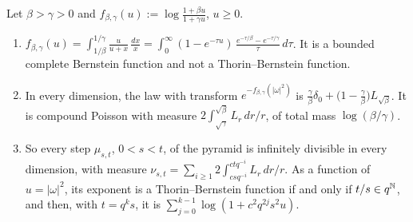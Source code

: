 \begin{proposition}
\label{prop:matern-increments}
\leanok
Let $\beta > \gamma > 0$ and $f_{\beta,\gamma}(u) := \log\frac{1 + \beta u}{1 + \gamma u}$, $u \ge 0$.
\begin{enumerate}
\item $f_{\beta,\gamma}(u) = \int_{1/\beta}^{1/\gamma}\frac{u}{u + x}\,\frac{dx}{x}
= \int_0^\infty(1 - e^{-\tau u})\,\frac{e^{-\tau/\beta} - e^{-\tau/\gamma}}{\tau}\,d\tau$. It is a
bounded complete Bernstein function and not a Thorin--Bernstein function.
\item In every dimension, the law with transform $e^{-f_{\beta,\gamma}(|\omega|^2)}$ is
$\frac\gamma\beta\delta_0 + \bigl(1 - \frac\gamma\beta\bigr)L_{\sqrt\beta}$. It is compound Poisson with
\Levy{} measure $2\int_{\sqrt\gamma}^{\sqrt\beta}L_r\,dr/r$, of total mass $\log(\beta/\gamma)$.
\item So every step $\mu_{s,t}$, $0 < s < t$, of the \Matern{} pyramid is infinitely divisible in
every dimension, with \Levy{} measure
$\nu_{s,t} = \sum_{i \ge 1}2\int_{csq^{-i}}^{ctq^{-i}}L_r\,dr/r$. As a function of $u = |\omega|^2$,
its exponent is a Thorin--Bernstein function if and only if $t/s \in q^{\mathbb{N}}$, and then, with
$t = q^ks$, it is $\sum_{j=0}^{k-1}\log(1 + c^2q^{2j}s^2u)$.
\end{enumerate}

\end{proposition}
